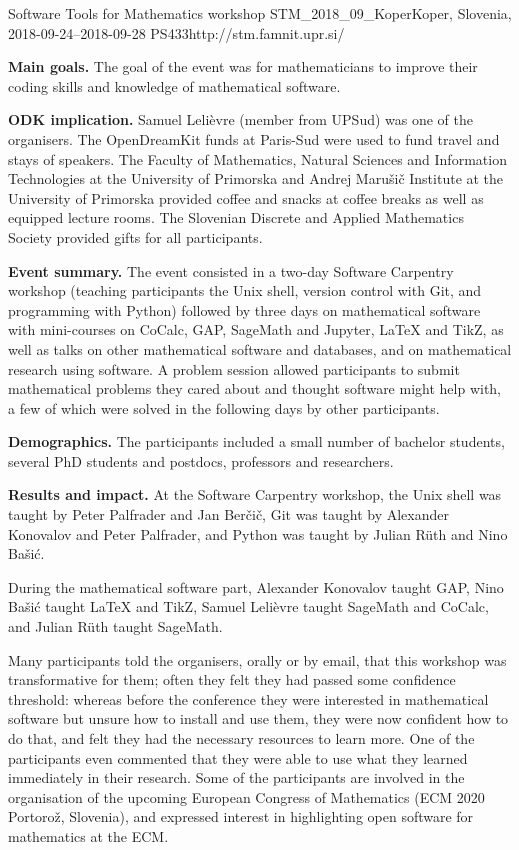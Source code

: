 \begin{event}{Software Tools for Mathematics workshop}%
{STM_2018_09_Koper}{Koper, Slovenia, 2018-09-24--2018-09-28}%
{PS}{43}{3}{http://stm.famnit.upr.si/}

\textbf{Main goals.} The goal of the event was for mathematicians
to improve their coding skills and knowledge of mathematical software.

\textbf{ODK implication.} Samuel Lelièvre (\ODK member from UPSud) was one of
the organisers. The OpenDreamKit funds at Paris-Sud were used to fund travel
and stays of speakers.
The Faculty of Mathematics, Natural Sciences and Information Technologies at the University of Primorska
and Andrej Marušič Institute at the University of Primorska 
provided coffee and snacks at coffee breaks as well as equipped lecture rooms. 
The Slovenian Discrete and Applied Mathematics Society provided gifts for all participants.

\textbf{Event summary.} The event consisted in a two-day Software Carpentry
workshop (teaching participants the Unix shell, version control with Git,
and programming with Python) followed by three days on mathematical software
with mini-courses on CoCalc, GAP, SageMath and Jupyter, LaTeX and TikZ, as well
as talks on other mathematical software and databases, and on mathematical
research using software. A problem session allowed participants to submit
mathematical problems they cared about and thought software might help with,
a few of which were solved in the following days by other participants.

\textbf{Demographics.} The participants included a small number of bachelor
students, several PhD students and postdocs, professors and
researchers.

\textbf{Results and impact.} At the Software Carpentry workshop, 
the Unix shell was taught by Peter Palfrader and Jan Ber\v{c}i\v{c}, 
Git was taught by Alexander Konovalov and Peter Palfrader,
and Python was taught by Julian R\"{u}th and Nino Ba\v{s}i\'{c}.

During the mathematical software part,
Alexander Konovalov taught GAP,
Nino Ba\v{s}i\'{c} taught LaTeX and TikZ,
Samuel Leli\`{e}vre taught SageMath and CoCalc,
and Julian R\"{u}th taught SageMath.

Many participants told the organisers, orally or by email, that this workshop
was transformative for them; often they felt they had passed some confidence
threshold: whereas before the conference they were interested in mathematical
software but unsure how to install and use them, they were now confident how
to do that, and felt they had the necessary resources to learn more.
One of the participants even commented that they were able to use what they learned
immediately in their research.
Some of the participants are involved in the organisation of the upcoming 
European Congress of Mathematics (ECM 2020 Portoro\v{z}, Slovenia),
and expressed interest in highlighting open software for mathematics at the ECM.


\end{event}
